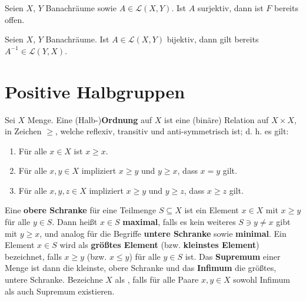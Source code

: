 

\begin{fsatz}\cite{banasiak_arlotti_2006}\label{Satz von der offenen Abbildung}
Seien $X$, $Y$ Banachräume sowie $A\in\mathcal L(X,Y)$. Ist $A$ surjektiv, dann ist $F$ bereits offen.
\end{fsatz}



\begin{fsatz}\cite{banasiak_arlotti_2006}\label{Banachs Homomorphiesatz}
Seien $X$, $Y$ Banachräume. Ist $A\in\mathcal L(X,Y)$ bijektiv, dann gilt bereits $A^{-1}\in \mathcal L(Y,X)$.
\end{fsatz}


\section{Positive Halbgruppen}

\begin{defi}[Ordnung]
Sei $X$ Menge. Eine (Halb-)\textbf{Ordnung} auf $X$ ist eine (binäre) Relation auf $X\times X$, in Zeichen $\geq$, welche reflexiv, transitiv und anti-symmetrisch ist; d. h. es gilt:
\begin{enumerate}
    \item Für alle $x\in X$ ist $x\geq x$.
    \item Für alle $x, y\in X$ impliziert $x\geq y$ und $y\geq x$, dass $x=y$ gilt.
    \item Für alle $x,y,z\in X$ impliziert $x\geq y$ und $y\geq z$, dass $x\geq z$ gilt.
\end{enumerate}
Eine \textbf{obere Schranke} für eine Teilmenge $S\subseteq X$ ist ein Element $x\in X$ mit $x\geq y$ für alle $y\in S$. Dann heißt $x\in S$ \textbf{maximal}, falls es kein weiteres $S\ni y\neq x$ gibt mit $y\geq x$, und analog für die Begriffe \textbf{untere Schranke} sowie \textbf{minimal}. Ein Element $x\in S$ wird als \textbf{größtes Element} (bzw. \textbf{kleinstes Element}) bezeichnet, falls $x\geq y$ (bzw. $x\leq y$) für alle $y\in S$ ist. Das \textbf{Supremum} einer Menge ist dann die kleinste, obere Schranke und das \textbf{Infimum} die größtes, untere Schranke. Bezeichne $X$ als , falls für alle Paare $x,y\in X$ sowohl Infimum als auch Supremum existieren.
\end{defi}


